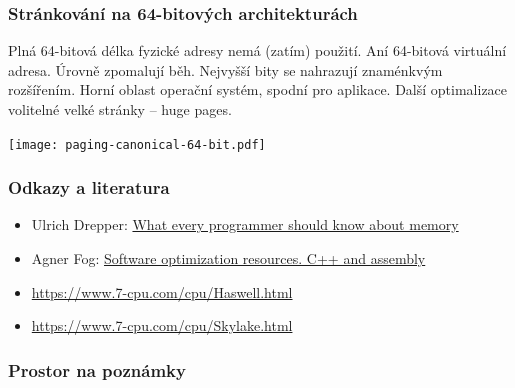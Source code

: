 \documentclass{beamer}
\begin{document}
\begin{frame}
\frametitle{Stránkování na 64-bitových architekturách}

Plná 64-bitová délka fyzické adresy nemá (zatím) použití.
Aní 64-bitová virtuální adresa. Úrovně zpomalují běh.
Nejvyšší bity se nahrazují znaménkvým rozšířením.
Horní oblast operační systém, spodní pro aplikace.
Další optimalizace volitelné velké stránky -- huge pages.

{
\centering

\texttt{[image: paging-canonical-64-bit.pdf]}

}
\end{frame}

\begin{frame}
\frametitle{Odkazy a literatura}

\begin{itemize}
\item Ulrich Drepper: \href{https://lwn.net/Articles/250967/}{What every programmer should know about memory}
\item Agner Fog: \href{https://www.agner.org/optimize/}{Software optimization resources. C++ and assembly}
\item \url{https://www.7-cpu.com/cpu/Haswell.html}
\item \url{https://www.7-cpu.com/cpu/Skylake.html}
\end{itemize}

\end{frame}

\begin{frame}
\frametitle{Prostor na poznámky}

\end{frame}
\end{document}
